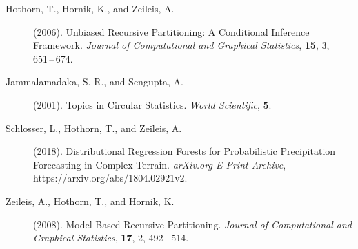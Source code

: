 \documentclass[twoside]{report}
\begin{document}



\begin{description}


\item[Hothorn, T., Hornik, K., and Zeileis, A.] (2006).
     Unbiased Recursive Partitioning: A Conditional Inference Framework.
     {\it Journal of Computational and Graphical Statistics}, {\bf 15}, 3,
     651\,--\,674. 

\item[Jammalamadaka, S. R., and Sengupta, A.] (2001).
     Topics in Circular Statistics.
     {\it World Scientific}, {\bf 5}. 



\item[Schlosser, L., Hothorn, T., and Zeileis, A.] (2018).
     Distributional Regression Forests for Probabilistic Precipitation Forecasting in Complex Terrain.
     {\it arXiv.org E-Print Archive}, https://arxiv.org/abs/1804.02921v2.

\item[Zeileis, A., Hothorn, T., and Hornik, K.] (2008).
     Model-Based Recursive Partitioning.
     {\it Journal of Computational and Graphical Statistics}, {\bf 17}, 2,
     492\,--\,514. 
     

\end{description}
\end{document}
